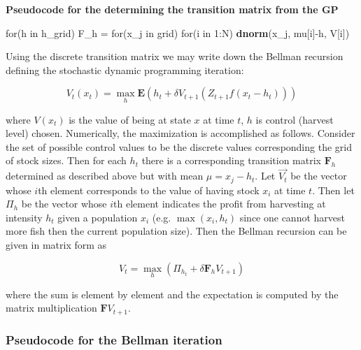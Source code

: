 \documentclass[author-year, review]{elsarticle} %
\newenvironment{Shaded}{}{}
\newcommand{\KeywordTok}[1]{\textcolor[rgb]{0.00,0.44,0.13}{\textbf{{#1}}}}
\newcommand{\DecValTok}[1]{\textcolor[rgb]{0.25,0.63,0.44}{{#1}}}
\newcommand{\StringTok}[1]{\textcolor[rgb]{0.25,0.44,0.63}{{#1}}}
\newcommand{\NormalTok}[1]{{#1}}
\begin{document}
\textbf{Pseudocode for the determining the transition matrix from the
GP}

\begin{Shaded}
\begin{Highlighting}[]
\NormalTok{for(h in h_grid)}
  \NormalTok{F_h =}\StringTok{ }\NormalTok{for(x_j in grid)}
          \NormalTok{for(i in }\DecValTok{1}\NormalTok{:N) }
            \KeywordTok{dnorm}\NormalTok{(x_j, mu[i]-h, V[i])}
\end{Highlighting}
\end{Shaded}

Using the discrete transition matrix we may write down the Bellman
recursion defining the stochastic dynamic programming iteration:

\begin{equation}
V_t(x_t) = \max_h \mathbf{E} \left( h_t + \delta V_{t+1}( Z_{t+1} f(x_t - h_t)) \right)
\end{equation}

where $V(x_t)$ is the value of being at state $x$ at time $t$, $h$ is
control (harvest level) chosen. Numerically, the maximization is
accomplished as follows. Consider the set of possible control values to
be the discrete values corresponding the grid of stock sizes. Then for
each $h_t$ there is a corresponding transition matrix $\mathbf{F}_h$
determined as described above but with mean $\mu = x_j - h_t$. Let
$\vec{V_t}$ be the vector whose $i$th element corresponds to the value
of having stock $x_i$ at time $t$. Then let $\Pi_h$ be the vector whose
$i$th element indicates the profit from harvesting at intensity $h_t$
given a population $x_i$ (e.g. $\max(x_i, h_t)$ since one cannot harvest
more fish then the current population size). Then the Bellman recursion
can be given in matrix form as

\[V_{t} = \max_h \left( \Pi_{h_{t}} + \delta \mathbf{F}_h V_{t+1} \right)\]

where the sum is element by element and the expectation is computed by
the matrix multiplication $\mathbf{F} V_{t+1}$.

\subsubsection{Pseudocode for the Bellman
iteration}\label{pseudocode-for-the-bellman-iteration-1}
\end{document}
